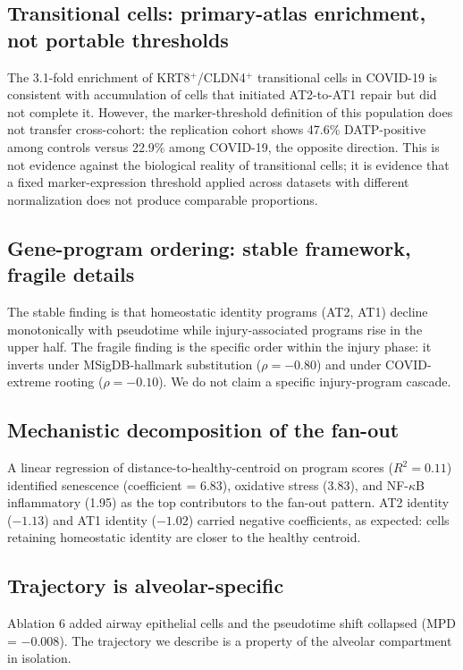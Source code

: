 \documentclass[11pt,a4paper]{article}
\begin{document}
\subsection{Transitional cells: primary-atlas enrichment, not portable thresholds}

The 3.1-fold enrichment of KRT8$^+$/CLDN4$^+$ transitional cells in COVID-19 is
consistent with accumulation of cells that initiated AT2-to-AT1 repair but did
not complete it. However, the marker-threshold definition of this population does
not transfer cross-cohort: the replication cohort shows 47.6\% DATP-positive among
controls versus 22.9\% among COVID-19, the opposite direction. This is not
evidence against the biological reality of transitional cells; it is evidence that
a fixed marker-expression threshold applied across datasets with different
normalization does not produce comparable proportions.

\subsection{Gene-program ordering: stable framework, fragile details}

The stable finding is that homeostatic identity programs (AT2, AT1) decline
monotonically with pseudotime while injury-associated programs rise in the upper
half. The fragile finding is the specific order within the injury phase: it
inverts under MSigDB-hallmark substitution ($\rho = -0.80$) and under
COVID-extreme rooting ($\rho = -0.10$). We do not claim a specific
injury-program cascade.

\subsection{Mechanistic decomposition of the fan-out}

A linear regression of distance-to-healthy-centroid on program scores
($R^{2} = 0.11$) identified senescence (coefficient = 6.83), oxidative stress
(3.83), and NF-$\kappa$B inflammatory (1.95) as the top contributors to the
fan-out pattern. AT2 identity ($-1.13$) and AT1 identity ($-1.02$) carried negative
coefficients, as expected: cells retaining homeostatic identity are closer to the
healthy centroid.

\subsection{Trajectory is alveolar-specific}

Ablation 6 added airway epithelial cells and the pseudotime shift collapsed (MPD
= $-0.008$). The trajectory we describe is a property of the alveolar compartment
in isolation.
\end{document}
